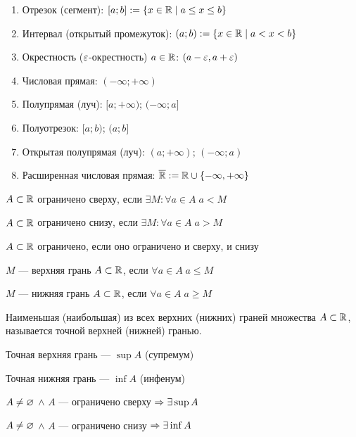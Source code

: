 \documentclass{article}
\begin{document}

\begin{enumerate}
	\item Отрезок (сегмент): $[a;b] := \{x\in\mathbb{R}\;|\;a\leq x\leq b\}$
	\item Интервал (открытый промежуток): $(a;b) := \{x\in\mathbb{R}\;|\;a<x<b\}$
	\item Окрестность ($\varepsilon$-окрестность) $a\in\mathbb{R}$:
	      $(a-\varepsilon,a+\varepsilon)$
	\item Числовая прямая: $(-\infty;+\infty)$
	\item Полупрямая (луч): $[a;+\infty)$; $(-\infty;a]$
	\item Полуотрезок: $[a;b)$; $(a;b]$
	\item Открытая полупрямая (луч): $(a;+\infty)$; $(-\infty;a)$
	\item Расширенная числовая прямая: $\overline{\mathbb{R}}:=\mathbb{R}\cup\{-\infty,+\infty\}$
\end{enumerate}


$A\subset\mathbb{R}$ ограничено сверху, если $\exists M:\forall a\in A\;a<M$

$A\subset\mathbb{R}$ ограничено снизу, если $\exists M:\forall a\in A\;a>M$

$A\subset\mathbb{R}$ ограничено, если оно ограничено и сверху, и снизу


$M$ --- верхняя грань $A\subset\mathbb{R}$, если $\forall a\in A\;a\leq M$

$M$ --- нижняя грань $A\subset\mathbb{R}$, если $\forall a\in A\;a\geq M$

Наименьшая (наибольшая) из всех верхних (нижних) граней множества $A\subset\mathbb{R}$,
называется точной верхней (нижней) гранью.

Точная верхняя грань --- $\sup A$ (супремум)

Точная нижняя грань --- $\inf A$ (инфенум)

\pagebreak

\theorem

$A \neq\varnothing$ $\land$ $A$ --- ограничено сверху $\Rightarrow \exists \sup A$

$A \neq\varnothing$ $\land$ $A$ --- ограничено снизу $\Rightarrow \exists \inf A$
\end{document}
